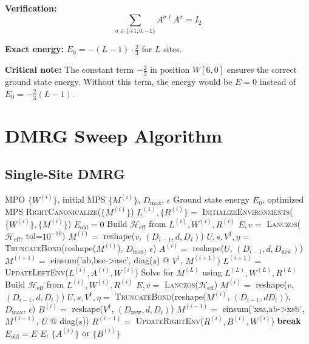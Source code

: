 \documentclass[aps,prb,onecolumn,scriptaddress]{revtex4-2}
\newcommand{\eps}{\epsilon}
\begin{document}
	\textbf{Verification:}
	\begin{equation}
		\sum_{\sigma \in \{+1, 0, -1\}} A^{\sigma\dagger} A^{\sigma} = I_2
	\end{equation}
	
	\textbf{Exact energy:} $E_0 = -(L-1) \cdot \frac{2}{3}$ for $L$ sites.
	
	\textbf{Critical note:} The constant term $-\frac{2}{3}$ in position $W[6,0]$ ensures the correct ground state energy. Without this term, the energy would be $E = 0$ instead of $E_0 = -\frac{2}{3}(L-1)$.
	
	\section{DMRG Sweep Algorithm}
	
	\subsection{Single-Site DMRG}
	
	\begin{algorithm}[H]
		\caption{SingleSiteDMRG}
		\begin{algorithmic}[1]
			\Require MPO $\{W^{(i)}\}$, initial MPS $\{M^{(i)}\}$, $D_{\max}$, $\eps$
			\Ensure Ground state energy $E_0$, optimized MPS
			\State \textsc{RightCanonicalize}($\{M^{(i)}\}$)
			\State $L^{(1)}, \{R^{(i)}\} = $ \textsc{InitializeEnvironments}($\{W^{(i)}\}, \{M^{(i)}\}$)
			\State $E_{\text{old}} = 0$
			\State {}
			\State Build $\mathcal{H}_{\text{eff}}$ from $L^{(i)}, W^{(i)}, R^{(i)}$
			\State $E, v = $ \textsc{Lanczos}($\mathcal{H}_{\text{eff}}$, tol=$10^{-10}$)
			\State $M^{(i)} = $ reshape($v$, $(D_{i-1}, d, D_i)$)
			\State {}
			\State $U, s, V^\dagger, \eta = $ \textsc{TruncateBond}(reshape($M^{(i)}$), $D_{\max}$, $\eps$)
			\State $A^{(i)} = $ reshape($U$, $(D_{i-1}, d, D_{\text{new}})$)
			\State $M^{(i+1)} = $ einsum('ab,bsc->asc', diag($s$) @ $V^\dagger$, $M^{(i+1)}$)
			\State $L^{(i+1)} = $ \textsc{UpdateLeftEnv}($L^{(i)}, A^{(i)}, W^{(i)}$)
			\EndFor
			\State {}
			\State Solve for $M^{(L)}$ using $L^{(L)}, W^{(L)}, R^{(L)}$
			\State {}
			\State Build $\mathcal{H}_{\text{eff}}$ from $L^{(i)}, W^{(i)}, R^{(i)}$
			\State $E, v = $ \textsc{Lanczos}($\mathcal{H}_{\text{eff}}$)
			\State $M^{(i)} = $ reshape($v$, $(D_{i-1}, d, D_i)$)
			\State {}
			\State $U, s, V^\dagger, \eta = $ \textsc{TruncateBond}(reshape($M^{(i)}$, $(D_{i-1}, dD_i)$), $D_{\max}$, $\eps$)
			\State $B^{(i)} = $ reshape($V^\dagger$, $(D_{\text{new}}, d, D_i)$)
			\State $M^{(i-1)} = $ einsum('xsa,ab->xsb', $M^{(i-1)}$, $U$ @ diag($s$))
			\State $R^{(i-1)} = $ \textsc{UpdateRightEnv}($R^{(i)}, B^{(i)}, W^{(i)}$)
			\EndFor
			\State {}
			\State \textbf{break}
			\EndIf
			\State $E_{\text{old}} = E$
			\EndWhile
			\State \Return $E$, $\{A^{(i)}\}$ or $\{B^{(i)}\}$
		\end{algorithmic}
	\end{algorithm}
	
\end{document}
